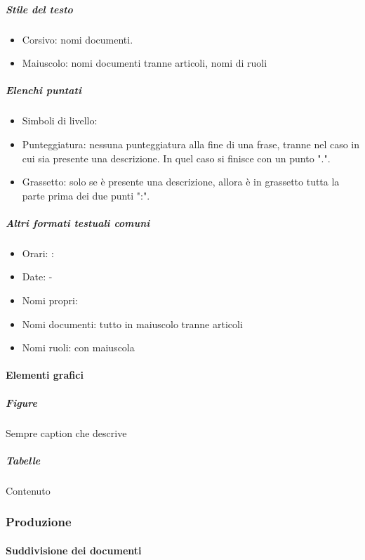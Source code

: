 			\subparagraph{Stile del testo}\label{PS:Documentazione:Design:NormeT:StileTesto}
			\begin{itemize}
				\item Corsivo: nomi documenti.
				\item Maiuscolo: nomi documenti tranne articoli, nomi di ruoli
			\end{itemize}

			\subparagraph{Elenchi puntati}\label{PS:Documentazione:Design:NormeT:ElenchiPuntati}
			\begin{itemize}
				\item Simboli di livello:
				\item Punteggiatura: nessuna punteggiatura alla fine di una frase, tranne nel caso in cui sia presente una descrizione. In quel caso si finisce con un punto ".".
				\item Grassetto: solo se è presente una descrizione, allora è in grassetto tutta la parte prima dei due punti ":".
			\end{itemize}

			\subparagraph{Altri formati testuali comuni} %
			\begin{itemize}
				\item Orari:  :
				\item Date:		-
				\item Nomi propri:
				\item Nomi documenti: tutto in maiuscolo tranne articoli
				\item Nomi ruoli: con maiuscola
			\end{itemize}



			\paragraph{Elementi grafici}

			\subparagraph{Figure}
			 Sempre caption che descrive 

			\subparagraph{Tabelle}
			Contenuto



		\subsubsection{Produzione}

			\paragraph{Suddivisione dei documenti}

